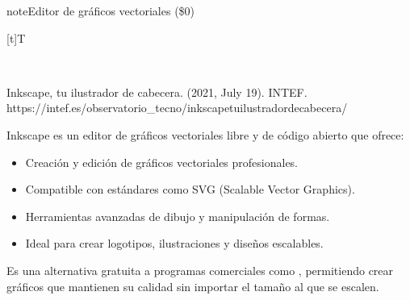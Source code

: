 \documentclass[letterpaper,10pt,spanish]{sphinxmanual}
\let\sphinxpxdimen\pdfpxdimen\else\newdimen\sphinxpxdimen
\begin{document}
\begin{sphinxadmonition}{note}{Editor de gráficos vectoriales  (\$0)}


\begin{savenotes}\sphinxattablestart
\sphinxthistablewithglobalstyle
\centering
\begin{tabulary}{\linewidth}[t]{T}
\sphinxtoprule
\sphinxtableatstartofbodyhook

\begin{sphinxfigure-in-table}
\centering
\capstart
\noindent\sphinxincludegraphics[width=360\sphinxpxdimen]{{image043}.png}
\label{\detokenize{1_guias/10ofimatica/G1012:id44}}\end{sphinxfigure-in-table}\relax
\\
\sphinxbottomrule
\end{tabulary}
\sphinxtableafterendhook\par
\sphinxattableend\end{savenotes}

\sphinxAtStartPar
%
\begin{footnote}[6]\sphinxAtStartFootnote
Inkscape, tu ilustrador de cabecera. (2021, July 19). INTEF. https://intef.es/observatorio\_tecno/inkscape\sphinxhyphen{}tu\sphinxhyphen{}ilustrador\sphinxhyphen{}de\sphinxhyphen{}cabecera/
%
\end{footnote} Inkscape es un editor de gráficos vectoriales libre y de código abierto que ofrece:
\begin{itemize}
\item {} 
\sphinxAtStartPar
Creación y edición de gráficos vectoriales profesionales.

\item {} 
\sphinxAtStartPar
Compatible con estándares como SVG (Scalable Vector Graphics).

\item {} 
\sphinxAtStartPar
Herramientas avanzadas de dibujo y manipulación de formas.

\item {} 
\sphinxAtStartPar
Ideal para crear logotipos, ilustraciones y diseños escalables.

\end{itemize}

\sphinxAtStartPar
Es una alternativa gratuita a programas comerciales como , permitiendo crear gráficos que mantienen su calidad sin importar el tamaño al que se escalen.
\end{sphinxadmonition}
\end{document}

